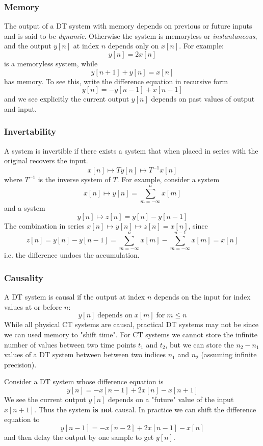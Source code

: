 \subsubsection{Memory}
The output of a DT system with memory depends on previous or future inputs and is said to be {\it dynamic}. Otherwise the system is memoryless or {\it instantaneous}, and the output $y[n]$ at index $n$ depends only on $x[n]$.
For example:
\[
y[n] = 2x[n]
\]
is a memoryless system, while
\[
y[n+1] + y[n] = x[n]
\]
has memory. To  see this, write the difference equation in recursive form
\[
y[n] = -y[n-1] + x[n-1]
\]
and we see explicitly the current output $y[n]$ depends on past values of output and input.

\subsubsection{Invertability}

A system is invertible if there exists a system that when placed in series with the original recovers the input.
\[
x[n] \mapsto{T} y[n] \mapsto{T^{-1}} x[n]
\]
where $T^{-1}$ is the inverse system of $T$. For example, consider a system
\[
x[n] \mapsto y[n] = \sum\limits_{m=-\infty}^{n} x[m]
\]
and a system
\[
y[n] \mapsto z[n] = y[n] - y[n-1]
\]
The combination in series $x[n] \mapsto y[n] \mapsto z[n] = x[n]$, since
\[
z[n] = y[n] - y[n-1] = \sum\limits_{m=-\infty}^{n} x[m] - \sum\limits_{m=-\infty}^{n-1} x[m] = x[n]
\]
i.e. the difference undoes the accumulation.

\subsubsection{Causality}
A DT system is causal if the output at index $n$ depends on the input for index values at or before $n$:
\[
y[n] \;\text{depends on}\; x[m] \;\text{for} \; m \leq n
\]
While all physical CT systems are causal, practical DT systems may not be since we can used memory to "shift time". For CT systems we cannot store the infinite number of values between two time points $t_1$ and $t_2$, but we can store the $n_2-n_1$ values of a DT system between between two indices $n_1$ and $n_2$ (assuming infinite precision).

\begin{example}
Consider a DT system whose difference equation is
\[
y[n] = -x[n-1] + 2x[n] - x[n+1]
\]
We see the current output $y[n]$ depends on a "future" value of the input $x[n+1]$. Thus the system \textbf{is not} causal. In practice we can shift the difference equation to
\[
y[n-1] = -x[n-2] + 2x[n-1] - x[n]
\]
and then delay the output by one sample to get $y[n]$.
\end{example}

